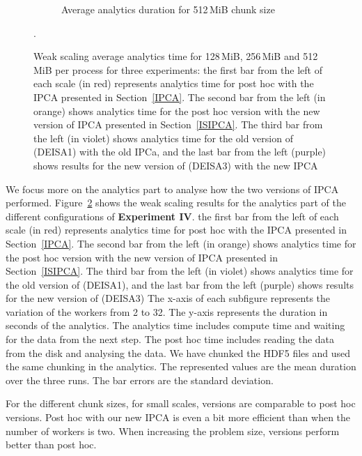 \begin{figure}[h!]
\begin{subfigure}[b]{0.3\textwidth}
         \caption{Average analytics duration for 512\,MiB chunk size}
         \label{fig:A512_1_3_p}
     \end{subfigure}
        \caption{Weak scaling average analytics time for 128\,MiB, 256\,MiB and 512\,MiB per process for three experiments: the first bar from the left of each scale (in red) represents analytics time for post hoc with the IPCA presented in Section~\ref{IPCA}. The second bar from the left (in orange) shows analytics time for the post hoc version with the new version of IPCA presented in Section~\ref{ISIPCA}. The third bar from the left (in violet) shows analytics time for the old version of \deisa (DEISA1) with the old IPCa, and the last bar from the left (purple) shows results for the new version of \deisa (DEISA3) with the new IPCA}. 
        \label{fig:perfA3}
\end{figure}

We focus more on the analytics part to analyse how the two versions of IPCA performed. Figure~\ref{fig:perfA3} shows the weak scaling results for the analytics part of the different configurations of \textbf{Experiment IV}.
the first bar from the left of each scale (in red) represents analytics time for post hoc with the IPCA presented in Section~\ref{IPCA}. 
The second bar from the left (in orange) shows analytics time for the post hoc version with the new version of IPCA presented in Section~\ref{ISIPCA}. 
The third bar from the left (in violet) shows analytics time for the old version of \deisa (DEISA1), and the last bar from the left (purple) shows results for the new version of \deisa (DEISA3)
The x-axis of each subfigure represents the variation of the \dask workers from 2 to 32. The y-axis represents the duration in seconds of the analytics. 
The \deisa analytics time includes compute time and waiting for the data from the next step. The post hoc time includes reading the data from the disk and analysing the data. We have chunked the HDF5 files and used the same chunking in the analytics.
The represented values are the mean duration over the three runs. The bar errors are the standard deviation.      

For the different chunk sizes, for small scales, \deisa versions are comparable to post hoc versions. Post hoc with our new IPCA is even a bit more efficient than \deisa when the number of \dask workers is two. When increasing the problem size, \deisa versions perform better than post hoc.


